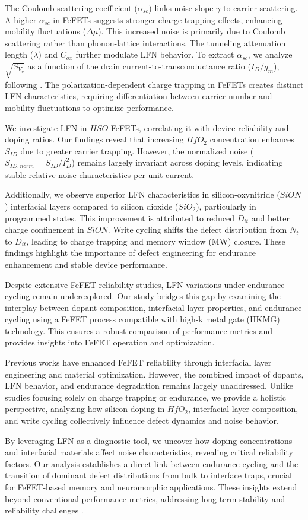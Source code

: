 The Coulomb scattering coefficient ($\alpha_{sc}$) links noise slope $\gamma$ to carrier scattering. A higher $\alpha_{sc}$ in FeFETs suggests stronger charge trapping effects, enhancing mobility fluctuations ($\Delta \mu$). This increased noise is primarily due to Coulomb scattering rather than phonon-lattice interactions. The tunneling attenuation length ($\lambda$) and $C_{ox}$ further modulate LFN behavior. To extract $\alpha_{sc}$, we analyze $\sqrt{S_{V_g}}$ as a function of the drain current-to-transconductance ratio ($I_D/g_m$), following \cite{scattering, scattering2}. The polarization-dependent charge trapping in FeFETs creates distinct LFN characteristics, requiring differentiation between carrier number and mobility fluctuations to optimize performance.

We investigate LFN in $HSO$-FeFETs, correlating it with device reliability and doping ratios. Our findings reveal that increasing $HfO_2$ concentration enhances $S_{ID}$ due to greater carrier trapping. However, the normalized noise ($S_{ID,norm} = S_{ID}/I_D^2$) remains largely invariant across doping levels, indicating stable relative noise characteristics per unit current.

Additionally, we observe superior LFN characteristics in silicon-oxynitride ($SiON$) interfacial layers compared to silicon dioxide ($SiO_2$), particularly in programmed states. This improvement is attributed to reduced $D_{it}$ and better charge confinement in $SiON$. Write cycling shifts the defect distribution from $N_t$ to $D_{it}$, leading to charge trapping and memory window (MW) closure. These findings highlight the importance of defect engineering for endurance enhancement and stable device performance.

Despite extensive FeFET reliability studies, LFN variations under endurance cycling remain underexplored. Our study bridges this gap by examining the interplay between dopant composition, interfacial layer properties, and endurance cycling using a FeFET process compatible with high-k metal gate (HKMG) technology. This ensures a robust comparison of performance metrics and provides insights into FeFET operation and optimization.

Previous works have enhanced FeFET reliability through interfacial layer engineering and material optimization. However, the combined impact of dopants, LFN behavior, and endurance degradation remains largely unaddressed. Unlike studies focusing solely on charge trapping or endurance, we provide a holistic perspective, analyzing how silicon doping in $HfO_2$, interfacial layer composition, and write cycling collectively influence defect dynamics and noise behavior.

By leveraging LFN as a diagnostic tool, we uncover how doping concentrations and interfacial materials affect noise characteristics, revealing critical reliability factors. Our analysis establishes a direct link between endurance cycling and the transition of dominant defect distributions from bulk to interface traps, crucial for FeFET-based memory and neuromorphic applications. These insights extend beyond conventional performance metrics, addressing long-term stability and reliability challenges \cite{Rev2a1,rev211,rev2a3,rev2a4,Rev2a2}.